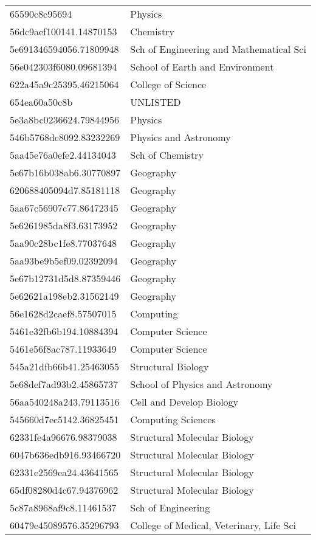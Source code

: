 \begin{tabular}{ll}
65590c8c95694 & Physics \\
56dc9aef100141.14870153 & Chemistry \\
5e691346594056.71809948 & Sch of Engineering and Mathematical Sci \\
56e042303f6080.09681394 & School of Earth and Environment \\
622a45a9c25395.46215064 & College of Science \\
654ea60a50c8b & UNLISTED \\
5e3a8bc0236624.79844956 & Physics \\
546b5768dc8092.83232269 & Physics and Astronomy \\
5aa45e76a0efe2.44134043 & Sch of Chemistry \\
5e67b16b038ab6.30770897 & Geography \\
620688405094d7.85181118 & Geography \\
5aa67c56907c77.86472345 & Geography \\
5e6261985da8f3.63173952 & Geography \\
5aa90c28bc1fe8.77037648 & Geography \\
5aa93be9b5ef09.02392094 & Geography \\
5e67b12731d5d8.87359446 & Geography \\
5e62621a198eb2.31562149 & Geography \\
56e1628d2caef8.57507015 & Computing \\
5461e32fb6b194.10884394 & Computer Science \\
5461e56f8ac787.11933649 & Computer Science \\
545a21dfb66b41.25463055 & Structural Biology \\
5e68def7ad93b2.45865737 & School of Physics and Astronomy \\
56aa540248a243.79113516 & Cell and Develop Biology \\
545660d7ec5142.36825451 & Computing Sciences \\
62331fe4a96676.98379038 & Structural Molecular Biology \\
6047b636edb916.93466720 & Structural Molecular Biology \\
62331e2569ea24.43641565 & Structural Molecular Biology \\
65df08280d4c67.94376962 & Structural Molecular Biology \\
5c87a8968af9c8.11461537 & Sch of Engineering \\
60479e45089576.35296793 & College of Medical, Veterinary, Life Sci \\

\end{tabular}
